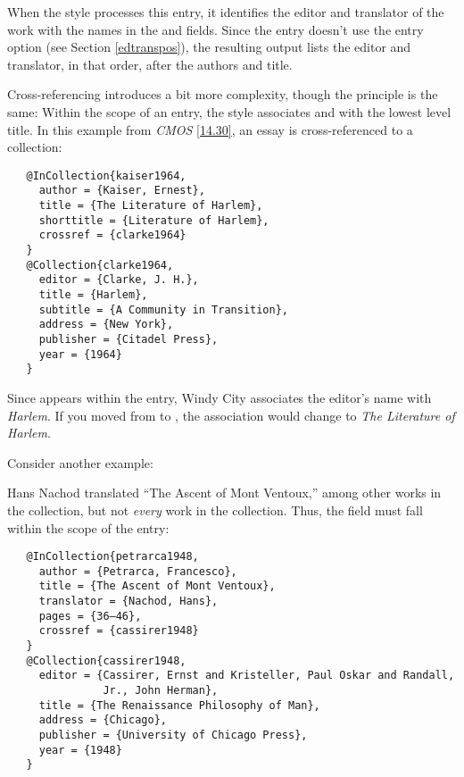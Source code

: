 \documentclass[11pt,letterpaper,oneside]{article}
\begin{document}
\noindent When the style processes this entry, it identifies the
editor and translator of the work with the names in the
 and  fields. Since the entry
doesn't use the  entry option (see Section
\ref{edtranspos}), the resulting output lists the editor and
translator, in that order, after the authors and title.

Cross-referencing introduces a bit more complexity, though the
principle is the same: Within the scope of an entry, the style
associates  and  with the lowest
level title. In this example from \textit{CMOS} \ref{14.30}, an essay
is cross-referenced to a collection:

\begin{verbatim}
   @InCollection{kaiser1964,
     author = {Kaiser, Ernest},
     title = {The Literature of Harlem},
     shorttitle = {Literature of Harlem},
     crossref = {clarke1964}
   }
   @Collection{clarke1964,
     editor = {Clarke, J. H.},
     title = {Harlem},
     subtitle = {A Community in Transition},
     address = {New York},
     publisher = {Citadel Press},
     year = {1964}
   }
\end{verbatim}

\begin{citebib}
\item \cite{kaiser1964}
\end{citebib}

\noindent Since  appears within the
 entry, Windy City associates the editor's name
with \textit{Harlem}. If you moved  from
 to , the association would
change to \textit{The Literature of Harlem}.

Consider another example:

\begin{citebib}
\item \cite{petrarca1948}
\end{citebib}

\noindent Hans Nachod translated ``The Ascent of Mont Ventoux,'' among
other works in the collection, but not \textit{every} work in the
collection. Thus, the  field must fall within the
scope of the  entry:

\begin{verbatim}
   @InCollection{petrarca1948,
     author = {Petrarca, Francesco},
     title = {The Ascent of Mont Ventoux},
     translator = {Nachod, Hans},
     pages = {36–46},
     crossref = {cassirer1948}
   }
   @Collection{cassirer1948,
     editor = {Cassirer, Ernst and Kristeller, Paul Oskar and Randall,
               Jr., John Herman},
     title = {The Renaissance Philosophy of Man},
     address = {Chicago},
     publisher = {University of Chicago Press},
     year = {1948}
   }
\end{verbatim}
\end{document}
